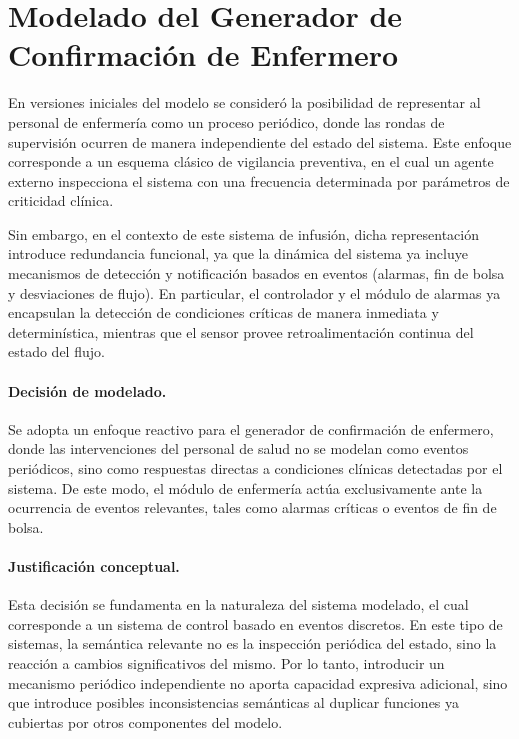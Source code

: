 \documentclass[11pt,a4paper]{article}
\begin{document}
\section{Modelado del Generador de Confirmación de Enfermero}

En versiones iniciales del modelo se consideró la posibilidad de representar al personal de enfermería como un proceso periódico, donde las rondas de supervisión ocurren de manera independiente del estado del sistema. Este enfoque corresponde a un esquema clásico de vigilancia preventiva, en el cual un agente externo inspecciona el sistema con una frecuencia determinada por parámetros de criticidad clínica.

Sin embargo, en el contexto de este sistema de infusión, dicha representación introduce redundancia funcional, ya que la dinámica del sistema ya incluye mecanismos de detección y notificación basados en eventos (alarmas, fin de bolsa y desviaciones de flujo). En particular, el controlador y el módulo de alarmas ya encapsulan la detección de condiciones críticas de manera inmediata y determinística, mientras que el sensor provee retroalimentación continua del estado del flujo.

\paragraph{Decisión de modelado.}
Se adopta un enfoque reactivo para el generador de confirmación de enfermero, donde las intervenciones del personal de salud no se modelan como eventos periódicos, sino como respuestas directas a condiciones clínicas detectadas por el sistema. De este modo, el módulo de enfermería actúa exclusivamente ante la ocurrencia de eventos relevantes, tales como alarmas críticas o eventos de fin de bolsa.

\paragraph{Justificación conceptual.}
Esta decisión se fundamenta en la naturaleza del sistema modelado, el cual corresponde a un sistema de control basado en eventos discretos. En este tipo de sistemas, la semántica relevante no es la inspección periódica del estado, sino la reacción a cambios significativos del mismo. Por lo tanto, introducir un mecanismo periódico independiente no aporta capacidad expresiva adicional, sino que introduce posibles inconsistencias semánticas al duplicar funciones ya cubiertas por otros componentes del modelo.
\end{document}
